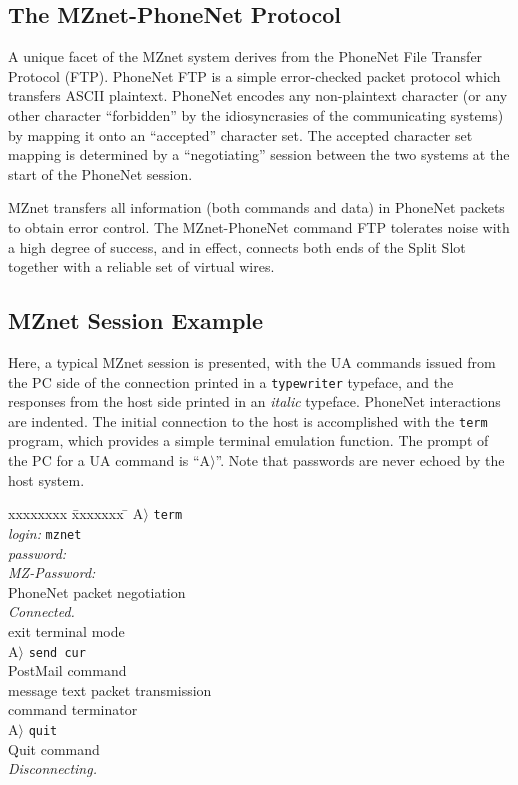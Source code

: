 \subsection*	{The MZnet-PhoneNet Protocol}
A unique facet of the MZnet system derives from the PhoneNet File 
Transfer Protocol (FTP).
PhoneNet FTP is a simple error-checked packet protocol which transfers
ASCII plaintext.
PhoneNet encodes any non-plaintext character (or any other character
``forbidden'' by the idiosyncrasies of the communicating systems) by
mapping it onto an ``accepted'' character set.
The accepted character set mapping is determined by
a ``negotiating'' session between the two systems at the start of
the PhoneNet session.

MZnet transfers all information (both commands and data) in PhoneNet
packets to obtain error control.
The MZnet-PhoneNet command FTP tolerates noise with a high degree
of success, and in effect, connects both ends of the Split Slot
together with a reliable set of virtual wires.

\subsection*	{MZnet Session Example}
Here, a typical MZnet session is presented, with the UA commands
issued from the PC side of the connection printed
in a {\tt typewriter} typeface, and the responses
from the host side printed
in an {\it italic} typeface.
PhoneNet interactions are indented.
The initial connection to the host is accomplished with the
{\tt term} program, which provides a simple terminal emulation
function.
The prompt of the PC for a UA command is ``A$\rangle$''.
Note that passwords are never echoed by the host system.

\begin{tabbing}
xxxxxxxx \= xxxxxxx \= \kill
\> A$\rangle$ {\tt term} \\
\> {\it login:} {\tt mznet} \\
\> {\it password:} \\
\> {\it MZ-Password:} \\
\> \> PhoneNet packet negotiation \\
\> {\it Connected.} \\
\> \> exit terminal mode \\
\> A$\rangle$ {\tt send cur} \\
\> \> PostMail command \\
\> \> message text packet transmission \\
\> \> command terminator \\
\> A$\rangle$ {\tt quit} \\
\> \> Quit command \\
\> {\it Disconnecting.}
\end{tabbing}

